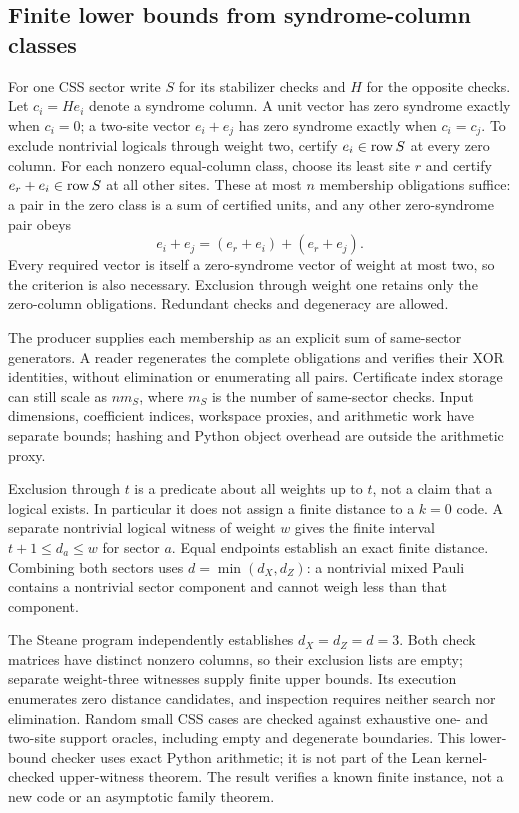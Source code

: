 \subsection{Finite lower bounds from syndrome-column classes}
For one CSS sector write $S$ for its stabilizer checks and $H$ for the opposite
checks. Let $c_i=He_i$ denote a syndrome column. A unit vector has zero syndrome
exactly when $c_i=0$; a two-site vector $e_i+e_j$ has zero syndrome exactly when
$c_i=c_j$. To exclude nontrivial logicals through weight two, certify
$e_i\in\operatorname{row} S$ at every zero column. For each nonzero equal-column class,
choose its least site $r$ and certify $e_r+e_i\in\operatorname{row} S$ at all other sites.
These at most $n$ membership obligations suffice: a pair in the zero class is
a sum of certified units, and any other zero-syndrome pair obeys
\[
e_i+e_j=(e_r+e_i)+(e_r+e_j).
\]
Every required vector is itself a zero-syndrome vector of weight at most two,
so the criterion is also necessary. Exclusion through weight one retains only
the zero-column obligations. Redundant checks and degeneracy are allowed.

The producer supplies each membership as an explicit sum of same-sector
generators. A reader regenerates the complete obligations and verifies their
XOR identities, without elimination or enumerating all pairs. Certificate
index storage can still scale as $nm_S$, where $m_S$ is the number of
same-sector checks. Input dimensions, coefficient indices, workspace proxies,
and arithmetic work have separate bounds; hashing and Python object overhead
are outside the arithmetic proxy.

Exclusion through $t$ is a predicate about all weights up to $t$, not a claim
that a logical exists. In particular it does not assign a finite distance to
a $k=0$ code. A separate nontrivial logical witness of weight $w$ gives the
finite interval $t+1\leq d_a\leq w$ for sector $a$. Equal endpoints establish
an exact finite distance. Combining both sectors uses
$d=\min(d_X,d_Z)$: a nontrivial mixed Pauli contains a nontrivial sector
component and cannot weigh less than that component.

The Steane program independently establishes $d_X=d_Z=d=3$. Both check
matrices have distinct nonzero columns, so their exclusion lists are empty;
separate weight-three witnesses supply finite upper bounds. Its execution
enumerates zero distance candidates, and inspection requires neither search
nor elimination. Random small CSS cases are checked against exhaustive
one- and two-site support oracles, including empty and degenerate boundaries.
This lower-bound checker uses exact Python arithmetic; it is not part of the
Lean kernel-checked upper-witness theorem. The result verifies a known finite
instance, not a new code or an asymptotic family theorem.

